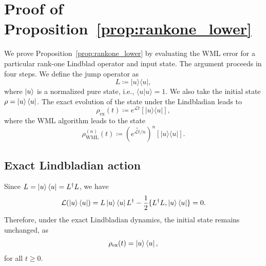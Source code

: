 \documentclass[superscriptaddress,amsmath,amssymb,aps,pra,letterpaper,tightenlines,notitlepages,12pt]{revtex4-2}
\begin{document}
\section{Proof of Proposition~\ref{prop:rankone_lower}}
\label{app:worst_prop_proof}
We prove Proposition~\ref{prop:rankone_lower} by evaluating the WML error for a particular rank-one Lindblad operator and input state.
The argument proceeds in four steps.
We define the jump operator as 
\begin{equation}
L\coloneqq |u\rangle\langle u|,
\end{equation}
where $\ket{u}$ is a normalized pure state, i.e., $\langle u | u\rangle =1$. We also take the initial state $\rho = \ket{u} \bra{u}$. The exact evolution of the state under the Lindbladian leads to
\begin{equation}
\rho_{\mathrm{ex}}(t)\coloneq e^{\mathcal Lt}[|u\rangle\langle u|],
\end{equation}
where the WML algorithm leads to the state
\begin{equation}
\rho_{\mathrm{WML}}^{(n)}(t)\coloneq \left(\widetilde{e^{\mathcal Lt/n}}\right)^n[|u\rangle\langle u|].
\end{equation}

\subsection{Exact Lindbladian action}
Since $L= \ket{u}\bra{u} = L^\dagger L$, we have
\begin{equation}
\mathcal L(\ket{u}\bra{u}) = L \ket{u}\bra{u} L^{\dagger} -\frac{1}{2}\{L^{\dagger}L, \ket{u}\bra{u} \}=0.
\end{equation}
Therefore, under the exact Lindbladian dynamics, the initial state remains unchanged, as
\begin{equation}
\rho_{\mathrm{ex}}(t) = \ket{u}\bra{u},
\label{eq:rho_ex_projector}
\end{equation}
for all $t\geq 0$.
\end{document}
